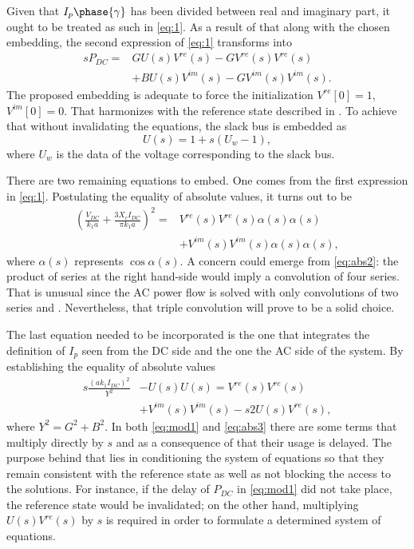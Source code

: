 \documentclass[conference]{IEEEtran}
\begin{document}
Given that $I_p\phase{\gamma}$ has been divided between real and imaginary part, it ought to be treated as such in \eqref{eq:1}. As a result of that along with the chosen embedding, the second expression of \eqref{eq:1} transforms into
\begin{equation}
  \begin{split}
  sP_{DC}=&GU(s)V^{re}(s)-GV^{re}(s)V^{re}(s)\\
  &+BU(s)V^{im}(s)-GV^{im}(s)V^{im}(s).
  \end{split}
  \label{eq:mod1}
\end{equation}
The proposed embedding is adequate to force the initialization $V^{re}[0]=1$, $V^{im}[0]=0$. That harmonizes with the reference state described in \cite{Trias2018}. To achieve that without invalidating the equations, the slack bus is embedded as
\begin{equation}
  U(s)=1+s(U_w-1),
  \label{eq:slack_emb}
\end{equation}
where $U_w$ is the data of the voltage corresponding to the slack bus. 

There are two remaining equations to embed. One comes from the first expression in \eqref{eq:1}. Postulating the equality of absolute values, it turns out to be
\begin{equation}
  \begin{split}
  \left(\frac{V_{DC}}{k_1a} + \frac{3X_cI_{DC}}{\pi k_1a}\right)^2=&V^{re}(s)V^{re}(s)\alpha(s)\alpha(s) \\
  &+ V^{im}(s)V^{im}(s)\alpha(s)\alpha(s),
  \end{split}
  \label{eq:abs2}
\end{equation}
where $\alpha(s)$ represents $\cos\alpha(s)$.
A concern could emerge from \eqref{eq:abs2}: the product of series at the right hand-side would imply a convolution of four series. That is unusual since the AC power flow is solved with only convolutions of two series \cite{Rao} and \cite{Trias2018}. Nevertheless, that triple convolution will prove to be a solid choice. 

The last equation needed to be incorporated is the one that integrates the definition of $I_p$ seen from the DC side and the one the AC side of the system. By establishing the equality of absolute values
\begin{equation}
  \begin{split}
  s\frac{(ak_1I_{DC})^2}{Y^2} &- U(s)U(s)=V^{re}(s)V^{re}(s)\\
  &+V^{im}(s)V^{im}(s)-s2U(s)V^{re}(s),
  \end{split}
  \label{eq:abs3}
\end{equation}
where $Y^2=G^2+B^2$. In both \eqref{eq:mod1} and \eqref{eq:abs3} there are some terms that multiply directly by $s$ and as a consequence of that their usage is delayed. The purpose behind that lies in conditioning the system of equations so that they remain consistent with the reference state as well as not blocking the access to the solutions. For instance, if the delay of $P_{DC}$ in \eqref{eq:mod1} did not take place, the reference state would be invalidated; on the other hand, multiplying $U(s)V^{re}(s)$ by $s$ is required in order to formulate a determined system of equations.
\end{document}

